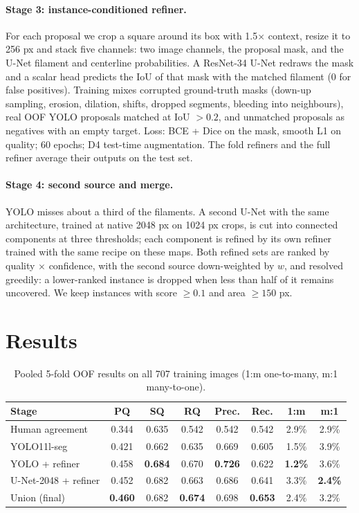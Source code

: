 \documentclass[10pt,twocolumn]{article}
\begin{document}
\paragraph{Stage 3: instance-conditioned refiner.} For each proposal we crop a square around its box with
1.5$\times$ context, resize it to 256 px and stack five channels: two image channels, the proposal mask,
and the U-Net filament and centerline probabilities. A ResNet-34 U-Net redraws the mask and a scalar head
predicts the IoU of that mask with the matched filament (0 for false positives). Training mixes
corrupted ground-truth masks (down-up sampling, erosion, dilation, shifts, dropped segments, bleeding into
neighbours), real OOF YOLO proposals matched at IoU $>0.2$, and unmatched proposals as negatives with an
empty target. Loss: BCE + Dice on the mask, smooth L1 on quality; 60 epochs; D4 test-time augmentation.
The fold refiners and the full refiner average their outputs on the test set.

\paragraph{Stage 4: second source and merge.} YOLO misses about a third of the filaments. A second U-Net
with the same architecture, trained at native 2048 px on 1024 px crops, is cut into connected components
at three thresholds; each component is refined by its own refiner trained with the same recipe on these
maps. Both refined sets are ranked by quality $\times$ confidence, with the second source down-weighted by
$w$, and resolved greedily: a lower-ranked instance is dropped when less than half of it remains uncovered.
We keep instances with score $\ge 0.1$ and area $\ge 150$ px.

\section{Results}
\begin{table}[t]
\centering\small\setlength{\tabcolsep}{6pt}
\caption{Pooled 5-fold OOF results on all 707 training images (1:m one-to-many, m:1 many-to-one).}
\label{tab:main}
\begin{tabular}{lccccccc}
\toprule
Stage & PQ & SQ & RQ & Prec. & Rec. & 1:m & m:1 \\
\midrule
Human agreement & 0.344 & 0.635 & 0.542 & 0.542 & 0.542 & 2.9\% & 2.9\% \\
YOLO11l-seg & 0.421 & 0.662 & 0.635 & 0.669 & 0.605 & 1.5\% & 3.9\% \\
YOLO + refiner & 0.458 & \textbf{0.684} & 0.670 & \textbf{0.726} & 0.622 & \textbf{1.2\%} & 3.6\% \\
U-Net-2048 + refiner & 0.452 & 0.682 & 0.663 & 0.686 & 0.641 & 3.3\% & \textbf{2.4\%} \\
Union (final) & \textbf{0.460} & 0.682 & \textbf{0.674} & 0.698 & \textbf{0.653} & 2.4\% & 3.2\% \\
\bottomrule
\end{tabular}
\end{table}
\end{document}
